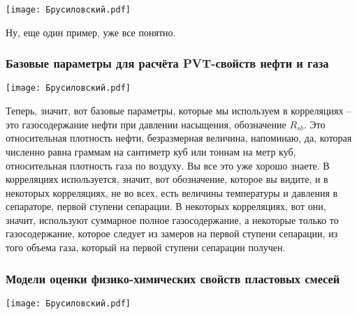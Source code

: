 \documentclass[main.tex]{subfiles}
\begin{document}
\begin{center}
\texttt{[image: Брусиловский.pdf]}
\end{center}

Ну, еще один пример, уже все понятно.

\subsubsection{Базовые параметры для расчёта PVT-свойств нефти и газа}

\begin{center}
\texttt{[image: Брусиловский.pdf]}
\end{center}

Теперь, значит, вот базовые параметры, которые мы используем в корреляциях -- это газосодержание нефти при давлении насыщения, обозначение $R_{sb}$.
Это относительная плотность нефти, безразмерная величина, напоминаю, да, которая численно равна граммам на сантиметр куб или тоннам на метр куб, относительная плотность газа по воздуху.
Вы все это уже хорошо знаете.
В корреляциях используется, значит, вот обозначение, которое вы видите, и в некоторых корреляциях, не во всех, есть величины температуры и давления в сепараторе, первой ступени сепарации.
В некоторых корреляциях, вот они, значит, используют суммарное полное газосодержание, а некоторые только то газосодержание, которое следует из замеров на первой ступени сепарации, из того объема газа, который на первой ступени сепарации получен.

\subsubsection{Модели оценки физико-химических свойств пластовых смесей}

\begin{center}
\texttt{[image: Брусиловский.pdf]}
\end{center}
\end{document}
